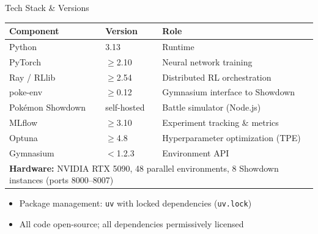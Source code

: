 \documentclass[aspectratio=169, 11pt]{beamer}
\begin{document}
\begin{frame}{Tech Stack \& Versions}
  \begin{center}
    \small
    \begin{tabularx}{0.92\textwidth}{l l X}
      \toprule
      \textbf{Component} & \textbf{Version} & \textbf{Role} \\
      \midrule
      Python        & 3.13          & Runtime \\
      PyTorch       & $\geq$2.10    & Neural network training \\
      Ray / RLlib   & $\geq$2.54    & Distributed RL orchestration \\
      poke-env      & $\geq$0.12    & Gymnasium interface to Showdown \\
      Pok\'{e}mon Showdown & self-hosted & Battle simulator (Node.js) \\
      MLflow        & $\geq$3.10    & Experiment tracking \& metrics \\
      Optuna        & $\geq$4.8     & Hyperparameter optimization (TPE) \\
      Gymnasium     & $<$1.2.3      & Environment API \\
      \midrule
      \multicolumn{3}{l}{\textbf{Hardware:} NVIDIA RTX 5090, 48 parallel
        environments, 8 Showdown instances (ports 8000--8007)} \\
      \bottomrule
    \end{tabularx}
  \end{center}

  \vspace{0.4em}
  \begin{itemize}
    \item Package management: \texttt{uv} with locked dependencies (\texttt{uv.lock})
    \item All code open-source; all dependencies permissively licensed
  \end{itemize}
\end{frame}
\end{document}
